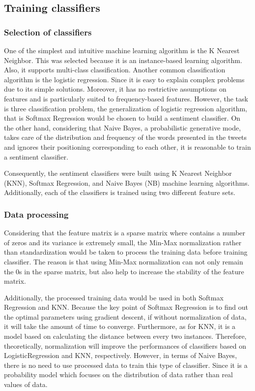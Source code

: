 \documentclass[11pt]{article}
\begin{document}
\subsection{Training classifiers}
\subsubsection{Selection of classifiers}
One of the simplest and intuitive machine learning algorithm is the K Nearest Neighbor. This was selected because it is an instance-based learning algorithm. Also, it supports multi-class classification. Another common classification algorithm is the logistic regression. Since it is easy to explain complex problems due to its simple solutions. Moreover, it has no restrictive assumptions on features and is particularly suited to frequency-based features. However, the task is three classification problem, the generalization of logistic regression algorithm, that is Softmax Regression would be chosen to build a sentiment classifier. On the other hand, considering that Naive Bayes, a probabilistic generative mode, takes care of the distribution and frequency of the words presented in the tweets and ignores their positioning corresponding to each other, it is reasonable to train a sentiment classifier.

Consequently, the sentiment classifiers were built using K Nearest Neighbor (KNN), Softmax Regression, and Naive Bayes (NB) machine learning algorithms.  Additionally, each of the classifiers is trained using two different feature sets.
\subsubsection{Data processing}
Considering that the feature matrix is a sparse matrix where contains a number of zeros and its variance is extremely small,  the Min-Max normalization rather than standardization would be taken to process the training data before training classifier.  The reason is that using Min-Max normalization can not only remain the 0s in the sparse matrix, but also help to increase the stability of the feature matrix. 

Additionally, the processed training data would be used in both Softmax Regression and KNN. Because the key point of Softmax Regression is to find out the optimal parameters using gradient descent, if without normalization of data, it will take the amount of time to converge. Furthermore, as for KNN, it is a model based on calculating the distance between every two instances. Therefore, theoretically, normalization will improve the performances of classifiers based on LogisticRegression and KNN, respectively. However, in terms of Naive Bayes, there is no need to use processed data to train this type of classifier. Since it is a probability model which focuses on the distribution of data rather than real values of data. 
\end{document}
